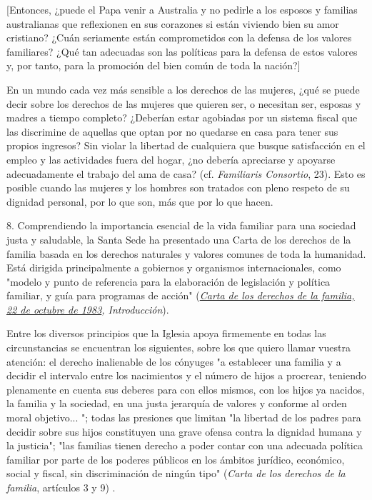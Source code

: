 \begin{body}
\begin{body}
{[}Entonces, ¿puede el Papa venir a Australia y no pedirle a los esposos y familias australianas que reflexionen en sus corazones si están viviendo bien su amor cristiano? ¿Cuán seriamente están comprometidos con la defensa de los valores familiares? ¿Qué tan adecuadas son las políticas para la defensa de estos valores y, por tanto, para la promoción del bien común de toda la nación?{]}

En un mundo cada vez más sensible a los derechos de las mujeres, ¿qué se puede decir sobre los derechos de las mujeres que quieren ser, o necesitan ser, esposas y madres a tiempo completo? ¿Deberían estar agobiadas por un sistema fiscal que las discrimine de aquellas que optan por no quedarse en casa para tener sus propios ingresos? Sin violar la libertad de cualquiera que busque satisfacción en el empleo y las actividades fuera del hogar, ¿no debería apreciarse y apoyarse adecuadamente el trabajo del ama de casa? (cf. \emph{Familiaris Consortio}, 23). Esto es posible cuando las mujeres y los hombres son tratados con pleno respeto de su dignidad personal, por lo que son, más que por lo que hacen.

8. Comprendiendo la importancia esencial de la vida familiar para una sociedad justa y saludable, la Santa Sede ha presentado una Carta de los derechos de la familia basada en los derechos naturales y valores comunes de toda la humanidad. Está dirigida principalmente a gobiernos y organismos internacionales, como "modelo y punto de referencia para la elaboración de legislación y política familiar, y guía para programas de acción" (\emph{\emph{\href{http://www.vatican.va/roman_curia/pontifical_councils/family/documents/rc_pc_family_doc_19831022_family-rights_it.html}{Carta de los derechos de la familia, 22 de octubre de 1983}, Introducción}}).

Entre los diversos principios que la Iglesia apoya firmemente en todas las circunstancias se encuentran los siguientes, sobre los que quiero llamar vuestra atención: el derecho inalienable de los cónyuges "a establecer una familia y a decidir el intervalo entre los nacimientos y el número de hijos a procrear, teniendo plenamente en cuenta sus deberes para con ellos mismos, con los hijos ya nacidos, la familia y la sociedad, en una justa jerarquía de valores y conforme al orden moral objetivo... "; todas las presiones que limitan "la libertad de los padres para decidir sobre sus hijos constituyen una grave ofensa contra la dignidad humana y la justicia"; "las familias tienen derecho a poder contar con una adecuada política familiar por parte de los poderes públicos en los ámbitos jurídico, económico, social y fiscal, sin discriminación de ningún tipo" (\emph{Carta de los derechos de la familia}, artículos 3 y 9) .


\end{body}
\end{body}
